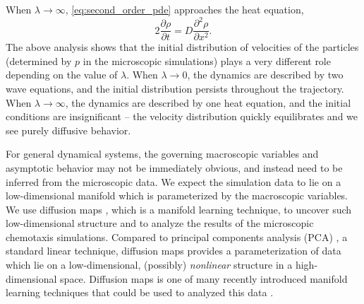 \documentclass[preprint]{elsarticle}
\begin{document}
When $\lambda \rightarrow \infty$, \eqref{eq:second_order_pde} approaches the heat equation,
\begin{equation}
2 \frac{\partial \rho}{\partial t} = D \frac{\partial ^2 \rho}{\partial x^2}.
\end{equation}
%
%
The above analysis shows that the initial distribution of velocities of the particles (determined by $p$ in the microscopic simulations) plays a very different role depending on the value of $\lambda$.
%
When $\lambda \rightarrow 0$, the dynamics are described by two wave equations, and the initial distribution persists throughout the trajectory.
%
When $\lambda \rightarrow \infty$, the dynamics are described by one heat equation, and the initial conditions are insignificant -- the velocity distribution quickly equilibrates and we see purely diffusive behavior.

For general dynamical systems, the governing macroscopic variables and asymptotic behavior may not be immediately obvious, and instead need to be inferred from the microscopic data.
%
We expect the simulation data to lie on a low-dimensional manifold which is parameterized by the macroscopic variables.
%
We use diffusion maps \cite{coifman2005geometric}, which is a manifold learning technique, to uncover such low-dimensional structure and to analyze the results of the microscopic chemotaxis simulations.
%
Compared to principal components analysis (PCA) \cite{shlens2005tutorial}, a standard linear technique, diffusion maps provides a parameterization of data which lie on a low-dimensional, (possibly) {\em nonlinear} structure in a high-dimensional space.
%
Diffusion maps is one of many recently introduced manifold learning techniques that could be used to analyzed this data \cite{roweis2000nonlinear, tenenbaum2000global, Belkin2003}.
\end{document}
